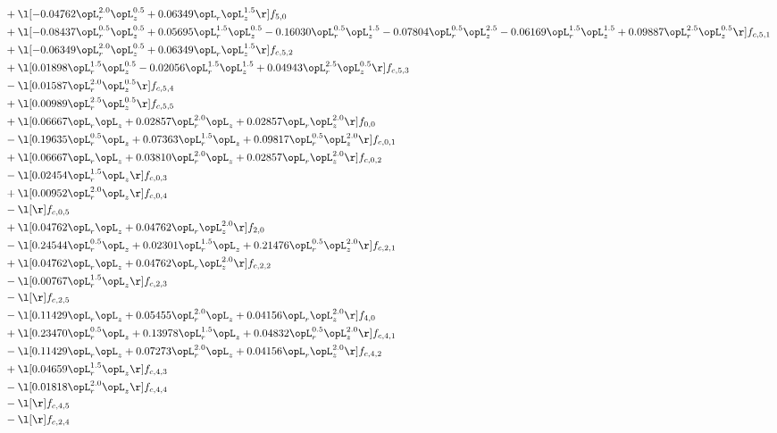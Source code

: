 \begin{alignat}{2}
& + \l[  -0.04762 \opL_r^{2.0} \opL_z^{0.5} +  0.06349 \opL_r \opL_z^{1.5}  \r] f_{5,0} \nonumber \\ 
& + \l[  -0.08437 \opL_r^{0.5} \opL_z^{0.5} +  0.05695 \opL_r^{1.5} \opL_z^{0.5}   -0.16030 \opL_r^{0.5} \opL_z^{1.5}   -0.07804 \opL_r^{0.5} \opL_z^{2.5}   -0.06169 \opL_r^{1.5} \opL_z^{1.5} +  0.09887 \opL_r^{2.5} \opL_z^{0.5}  \r] f_{c,5,1} \nonumber \\ 
& + \l[  -0.06349 \opL_r^{2.0} \opL_z^{0.5} +  0.06349 \opL_r \opL_z^{1.5}  \r] f_{c,5,2} \nonumber \\ 
& + \l[  0.01898 \opL_r^{1.5} \opL_z^{0.5}   -0.02056 \opL_r^{1.5} \opL_z^{1.5} +  0.04943 \opL_r^{2.5} \opL_z^{0.5}  \r] f_{c,5,3} \nonumber \\ 
& - \l[  0.01587 \opL_r^{2.0} \opL_z^{0.5}  \r] f_{c,5,4} \nonumber \\ 
& + \l[  0.00989 \opL_r^{2.5} \opL_z^{0.5}  \r] f_{c,5,5} \nonumber \\ 
& + \l[  0.06667 \opL_r \opL_z +  0.02857 \opL_r^{2.0} \opL_z +  0.02857 \opL_r \opL_z^{2.0}  \r] f_{0,0} \nonumber \\ 
& - \l[  0.19635 \opL_r^{0.5} \opL_z +  0.07363 \opL_r^{1.5} \opL_z +  0.09817 \opL_r^{0.5} \opL_z^{2.0}  \r] f_{c,0,1} \nonumber \\ 
& + \l[  0.06667 \opL_r \opL_z +  0.03810 \opL_r^{2.0} \opL_z +  0.02857 \opL_r \opL_z^{2.0}  \r] f_{c,0,2} \nonumber \\ 
& - \l[  0.02454 \opL_r^{1.5} \opL_z  \r] f_{c,0,3} \nonumber \\ 
& + \l[  0.00952 \opL_r^{2.0} \opL_z  \r] f_{c,0,4} \nonumber \\ 
& - \l[  \r] f_{c,0,5} \nonumber \\ 
& + \l[  0.04762 \opL_r \opL_z +  0.04762 \opL_r \opL_z^{2.0}  \r] f_{2,0} \nonumber \\ 
& - \l[  0.24544 \opL_r^{0.5} \opL_z +  0.02301 \opL_r^{1.5} \opL_z +  0.21476 \opL_r^{0.5} \opL_z^{2.0}  \r] f_{c,2,1} \nonumber \\ 
& + \l[  0.04762 \opL_r \opL_z +  0.04762 \opL_r \opL_z^{2.0}  \r] f_{c,2,2} \nonumber \\ 
& - \l[  0.00767 \opL_r^{1.5} \opL_z  \r] f_{c,2,3} \nonumber \\ 
& - \l[  \r] f_{c,2,5} \nonumber \\ 
& - \l[  0.11429 \opL_r \opL_z +  0.05455 \opL_r^{2.0} \opL_z +  0.04156 \opL_r \opL_z^{2.0}  \r] f_{4,0} \nonumber \\ 
& + \l[  0.23470 \opL_r^{0.5} \opL_z +  0.13978 \opL_r^{1.5} \opL_z +  0.04832 \opL_r^{0.5} \opL_z^{2.0}  \r] f_{c,4,1} \nonumber \\ 
& - \l[  0.11429 \opL_r \opL_z +  0.07273 \opL_r^{2.0} \opL_z +  0.04156 \opL_r \opL_z^{2.0}  \r] f_{c,4,2} \nonumber \\ 
& + \l[  0.04659 \opL_r^{1.5} \opL_z  \r] f_{c,4,3} \nonumber \\ 
& - \l[  0.01818 \opL_r^{2.0} \opL_z  \r] f_{c,4,4} \nonumber \\ 
& - \l[  \r] f_{c,4,5} \nonumber \\ 
& - \l[  \r] f_{c,2,4} \nonumber \\ 
\end{alignat} 



